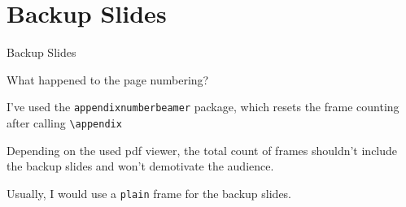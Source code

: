 \documentclass[aspectratio=169]{beamer}
\begin{document}
\appendix %
\section*{Backup Slides}
\begin{frame}
  \centering
  \vfill
  {\fontsize{40}{50}\selectfont Backup Slides}
  \vfill
\end{frame}

\begin{frame}{What happened to the page numbering?}
  \begin{vfilleditems}
    \item I've used the \texttt{appendixnumberbeamer}
    package, which resets the frame counting after calling
    \texttt{\textbackslash{}appendix}
    \item Depending on the used pdf viewer, the total
    count of frames shouldn't include the backup slides and
    won't demotivate the audience.
    \item Usually, I would use a \texttt{plain} frame
    for the backup slides.
  \end{vfilleditems}
\end{frame}
\end{document}
